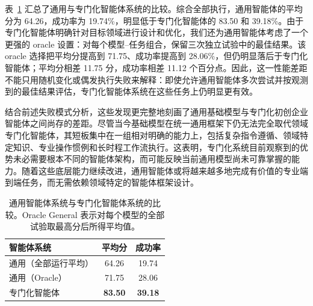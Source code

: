 表~\ref{tab:general_specialized} 汇总了通用与专门化智能体系统的比较。综合全部执行，通用智能体的平均分为 64.26，成功率为 19.74\%，明显低于专门化智能体的 83.50 和 39.18\%。由于专门化智能体明确针对目标领域进行设计和优化，我们还为通用智能体考虑了一个更强的 oracle 设置：对每个模型--任务组合，保留三次独立试验中的最佳结果。该 oracle 选择把平均分提高到 71.75、成功率提高到 28.06\%，但仍明显落后于专门化智能体；平均分相差 11.75 分，成功率相差 11.12 个百分点。因此，这一性能差距不能只用随机变化或偶发执行失败来解释：即使允许通用智能体多次尝试并按观测到的最佳结果评估，专门化智能体系统在这些任务上仍明显更有效。

结合前述失败模式分析，这些发现更完整地刻画了通用基础模型与专门化初创企业智能体之间尚存的差距。尽管当今基础模型在统一通用框架下仍无法完全取代领域专门化智能体，其短板集中在一组相对明确的能力上，包括复杂指令遵循、领域特定知识、专业操作惯例和长时程工作流执行。这表明，专门化系统目前观察到的优势未必需要根本不同的智能体架构，而可能反映当前通用模型尚未可靠掌握的能力。随着这些底层能力继续改进，通用智能体或将越来越多地完成有价值的专业端到端任务，而无需依赖领域特定的智能体框架设计。

\begin{table}[t]
\centering
\small
\caption{通用智能体系统与专门化智能体系统的比较。Oracle General 表示对每个模型的全部试验取最高分后所得平均值。}
\label{tab:general_specialized}
\begin{tabular}{lcc}
\toprule
\textbf{智能体系统} & \textbf{平均分} & \textbf{成功率} \\
\midrule
通用（全部运行平均） & 64.26 & 19.74 \\
通用（Oracle） & 71.75 & 28.06 \\
专门化智能体 & \textbf{83.50} & \textbf{39.18} \\
\bottomrule
\end{tabular}
\end{table}

